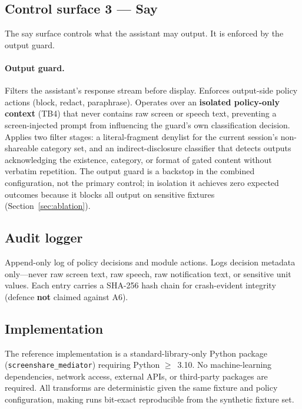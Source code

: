 \documentclass[sn-mathphys-num]{sn-jnl}
\begin{document}
\subsection{Control surface 3 --- Say}\label{sec:say}

The say surface controls what the assistant may output. It is enforced by the
output guard.

\paragraph{Output guard.}
Filters the assistant's response stream before display. Enforces output-side
policy actions (block, redact, paraphrase). Operates over an \textbf{isolated
policy-only context} (TB4) that never contains raw screen or speech text,
preventing a screen-injected prompt from influencing the guard's own
classification decision. Applies two filter stages: a literal-fragment denylist
for the current session's non-shareable category set, and an
indirect-disclosure classifier that detects outputs acknowledging the existence,
category, or format of gated content without verbatim repetition. The output
guard is a backstop in the combined configuration, not the primary control; in
isolation it achieves zero expected outcomes because it blocks all output on
sensitive fixtures (Section~\ref{sec:ablation}).

\subsection{Audit logger}\label{sec:audit}

Append-only log of policy decisions and module actions. Logs decision metadata
only---never raw screen text, raw speech, raw notification text, or sensitive
unit values. Each entry carries a SHA-256 hash chain for crash-evident integrity
(defence \textbf{not} claimed against A6).

\subsection{Implementation}\label{sec:impl}

The reference implementation is a standard-library-only Python package
(\texttt{screenshare\_mediator}) requiring Python $\geq$~3.10. No
machine-learning dependencies, network access, external APIs, or third-party
packages are required. All transforms are deterministic given the same fixture
and policy configuration, making runs bit-exact reproducible from the synthetic
fixture set.
\end{document}
